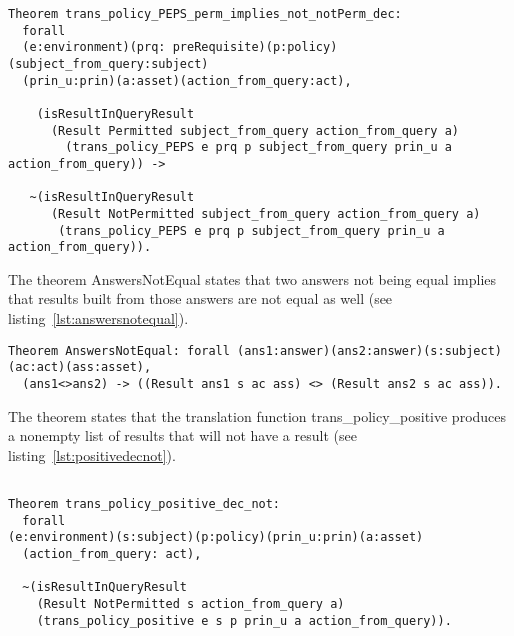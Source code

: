 \begin{lstlisting}
Theorem trans_policy_PEPS_perm_implies_not_notPerm_dec:
  forall
  (e:environment)(prq: preRequisite)(p:policy)(subject_from_query:subject)
  (prin_u:prin)(a:asset)(action_from_query:act),

    (isResultInQueryResult 
      (Result Permitted subject_from_query action_from_query a)
        (trans_policy_PEPS e prq p subject_from_query prin_u a action_from_query)) ->

   ~(isResultInQueryResult 
      (Result NotPermitted subject_from_query action_from_query a)
       (trans_policy_PEPS e prq p subject_from_query prin_u a action_from_query)).

\end{lstlisting}
The theorem AnswersNotEqual states that two answers not being equal implies that results built from those answers are not equal as well (see listing~\ref{lst:answersnotequal}).

\begin{lstlisting}
Theorem AnswersNotEqual: forall (ans1:answer)(ans2:answer)(s:subject)(ac:act)(ass:asset),
  (ans1<>ans2) -> ((Result ans1 s ac ass) <> (Result ans2 s ac ass)).

\end{lstlisting}

The theorem  states that the translation function trans_policy_positive produces a nonempty list of results that will not have a  result (see listing~\ref{lst:positivedecnot}).


\begin{lstlisting}

Theorem trans_policy_positive_dec_not:
  forall 
(e:environment)(s:subject)(p:policy)(prin_u:prin)(a:asset)
  (action_from_query: act),
 
  ~(isResultInQueryResult 
    (Result NotPermitted s action_from_query a)
    (trans_policy_positive e s p prin_u a action_from_query)).
\end{lstlisting}


